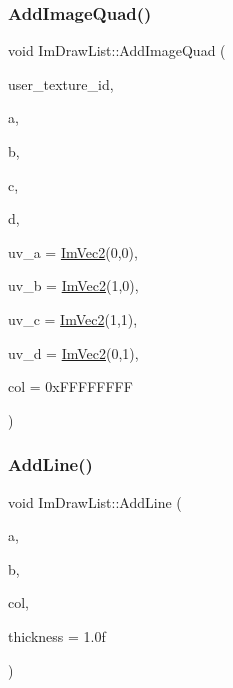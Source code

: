 \hypertarget{struct_im_draw_list_a1cc1f8d4d1812c65c7887b8d5aef31fe}{}\label{struct_im_draw_list_a1cc1f8d4d1812c65c7887b8d5aef31fe} 
\subsubsection{\texorpdfstring{Add\+Image\+Quad()}{AddImageQuad()}}
{\footnotesize\ttfamily void Im\+Draw\+List\+::\+Add\+Image\+Quad (\begin{DoxyParamCaption}\item[{Im\+Texture\+ID}]{user\+\_\+texture\+\_\+id,  }\item[{const \hyperlink{struct_im_vec2}{Im\+Vec2} \&}]{a,  }\item[{const \hyperlink{struct_im_vec2}{Im\+Vec2} \&}]{b,  }\item[{const \hyperlink{struct_im_vec2}{Im\+Vec2} \&}]{c,  }\item[{const \hyperlink{struct_im_vec2}{Im\+Vec2} \&}]{d,  }\item[{const \hyperlink{struct_im_vec2}{Im\+Vec2} \&}]{uv\+\_\+a = {\ttfamily \hyperlink{struct_im_vec2}{Im\+Vec2}(0,0)},  }\item[{const \hyperlink{struct_im_vec2}{Im\+Vec2} \&}]{uv\+\_\+b = {\ttfamily \hyperlink{struct_im_vec2}{Im\+Vec2}(1,0)},  }\item[{const \hyperlink{struct_im_vec2}{Im\+Vec2} \&}]{uv\+\_\+c = {\ttfamily \hyperlink{struct_im_vec2}{Im\+Vec2}(1,1)},  }\item[{const \hyperlink{struct_im_vec2}{Im\+Vec2} \&}]{uv\+\_\+d = {\ttfamily \hyperlink{struct_im_vec2}{Im\+Vec2}(0,1)},  }\item[{Im\+U32}]{col = {\ttfamily 0xFFFFFFFF} }\end{DoxyParamCaption})}

\hypertarget{struct_im_draw_list_a6db76ca2506dc86ad4d602fdcd2e2ea8}{}\label{struct_im_draw_list_a6db76ca2506dc86ad4d602fdcd2e2ea8} 
\subsubsection{\texorpdfstring{Add\+Line()}{AddLine()}}
{\footnotesize\ttfamily void Im\+Draw\+List\+::\+Add\+Line (\begin{DoxyParamCaption}\item[{const \hyperlink{struct_im_vec2}{Im\+Vec2} \&}]{a,  }\item[{const \hyperlink{struct_im_vec2}{Im\+Vec2} \&}]{b,  }\item[{Im\+U32}]{col,  }\item[{float}]{thickness = {\ttfamily 1.0f} }\end{DoxyParamCaption})}

